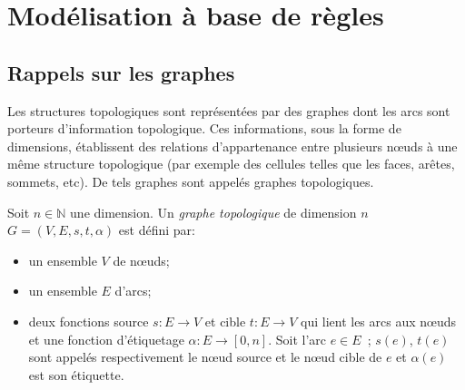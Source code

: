\section[Modélisation à base de règles]{Modélisation à base de règles}
\label{sec:etat-art-model-regles}


\subsection[Rappels sur les graphes]{Rappels sur les graphes}
\label{sec:etat-art-rappels-graphes}

Les structures topologiques sont représentées par des graphes dont les arcs sont
porteurs d'information topologique. %
Ces informations, sous la forme de dimensions, établissent des relations
d'appartenance entre plusieurs nœuds à une même structure topologique (par
exemple des cellules telles que les faces, arêtes, sommets, etc). %
De tels graphes sont appelés graphes topologiques. %

\begin{definition}
	\label{def:graphe-topologique}
	Soit $n \in \mathbb{N}$ une dimension. Un \emph{graphe topologique} de dimension $n$ $G=(V,E,s,t,\alpha)$ est défini par:
	\begin{itemize}
		\item un ensemble $V$ de nœuds;
		\item un ensemble $E$ d'arcs;
		\item deux fonctions source $s : E \to V$ et cible $t : E \to V$ qui lient les
		      arcs aux nœuds et une fonction d'étiquetage $\alpha : E \to [0,n]$. Soit
		      l'arc $e \in E$~; $s(e)$, $t(e)$ sont appelés respectivement le nœud
		      source et le nœud cible de $e$ et $\alpha(e)$ est son étiquette.
	\end{itemize}
\end{definition}

